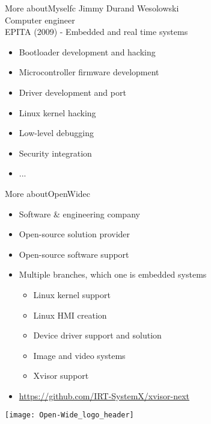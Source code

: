 \documentclass[english,slidetop,9pt,aspectratio=169]{beamer}
\begin{document}
  \begin{myframe}[1]{More about}{Myself}{c}
    Jimmy Durand Wesolowski\\
    Computer engineer\\
    EPITA (2009) - Embedded and real time systems
    \begin{itemize}
      \item Bootloader development and hacking
      \item Microcontroller firmware development
      \item Driver development and port
      \item Linux kernel hacking
      \item Low-level debugging
      \item Security integration
      \item ...
    \end{itemize}
  \end{myframe}

  \begin{myframe}[2]{More about}{OpenWide}{c}
    \begin{minipage}{0.50\textwidth}
      \begin{itemize}
        \item Software \& engineering company
        \item Open-source solution provider
        \item Open-source software support
        \item Multiple branches, which one is embedded systems
          \begin{itemize}
          \item Linux kernel support
          \item Linux HMI creation
          \item Device driver support and solution
          \item Image and video systems
          \item Xvisor support
          \end{itemize}
        \item \url{https://github.com/IRT-SystemX/xvisor-next}
      \end{itemize}
    \end{minipage}
    \begin{minipage}{0.49\textwidth}
      \centering
      \texttt{[image: Open-Wide\_logo\_header]}
    \end{minipage}
  \end{myframe}
\end{document}
